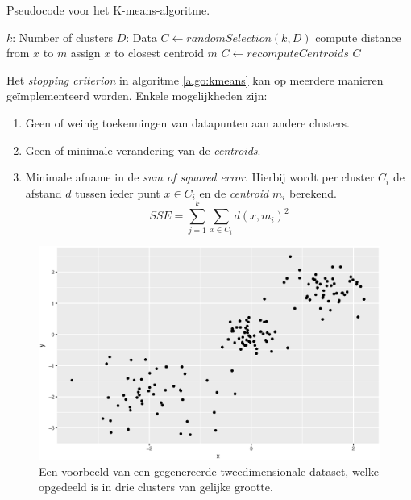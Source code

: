\begin{algorithm}
\caption{Pseudocode voor het K-means-algoritme.}
\label{algo:kmeans}
\begin{algorithmic} 
\Require $k$: Number of clusters
\Require $D$: Data
    \State $C \gets randomSelection(k, D)$
    \Repeat
        	\State compute distance from $x$ to $m$
        \EndFor
        \State assign $x$ to closest centroid $m$
    \EndFor
    \State $C \gets recomputeCentroids$
    \State \Return $C$ 
\EndFunction
\end{algorithmic}
\end{algorithm}

Het \emph{stopping criterion} in algoritme \ref{algo:kmeans} kan op meerdere manieren ge\"implementeerd worden. Enkele mogelijkheden zijn:

\begin{enumerate}
\item Geen of weinig toekenningen van datapunten aan andere clusters.
\item Geen of minimale verandering van de \emph{centroids}.
\item Minimale afname in de \emph{sum of squared error}. Hierbij wordt per cluster $C_i$  de afstand $d$ tussen ieder punt $x \in C_i$ en de \emph{centroid} $m_i$ berekend.
\begin{equation}
SSE = \sum_{j=1}^k{\sum_{x\in C_i}{d\left( x, m_i \right)^2}}
\end{equation}
\end{enumerate}

\begin{figure}
\centering
\caption{Een voorbeeld van een gegenereerde tweedimensionale dataset, welke opgedeeld is in drie clusters van gelijke grootte.}
\label{figure:clusters}
\includegraphics[width=\textwidth]{res/ch4_kmeans_before.eps}
\end{figure}

